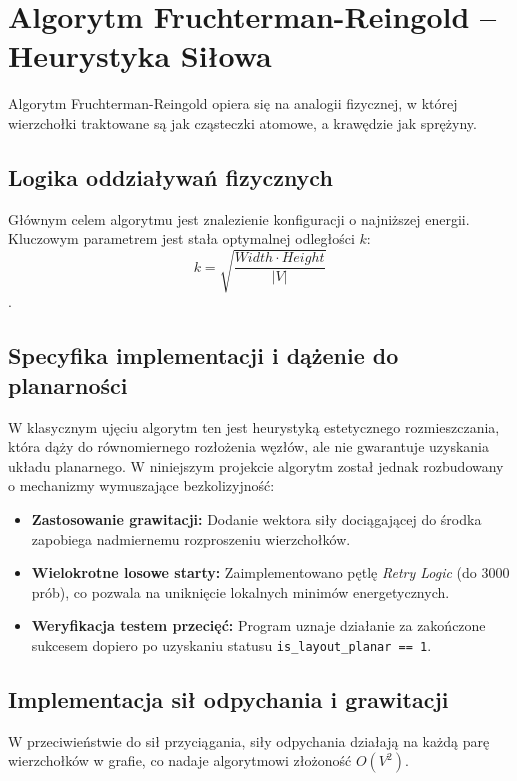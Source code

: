 \documentclass[12pt,a4paper]{article}
\begin{document}
\section{Algorytm Fruchterman-Reingold – Heurystyka Siłowa}

Algorytm Fruchterman-Reingold opiera się na analogii fizycznej, w której wierzchołki traktowane są jak cząsteczki atomowe, a krawędzie jak sprężyny.

\subsection{Logika oddziaływań fizycznych}
Głównym celem algorytmu jest znalezienie konfiguracji o najniższej energii. Kluczowym parametrem jest stała optymalnej odległości $k$:
\[ k = \sqrt{\frac{Width \cdot Height}{|V|}} \]
.

\subsection{Specyfika implementacji i dążenie do planarności}
W klasycznym ujęciu algorytm ten jest heurystyką estetycznego rozmieszczania, która dąży do równomiernego rozłożenia węzłów, ale nie gwarantuje uzyskania układu planarnego. W niniejszym projekcie algorytm został jednak rozbudowany o mechanizmy wymuszające bezkolizyjność:

\begin{itemize}
    \item \textbf{Zastosowanie grawitacji:} Dodanie wektora siły dociągającej do środka zapobiega nadmiernemu rozproszeniu wierzchołków.
    \item \textbf{Wielokrotne losowe starty:} Zaimplementowano pętlę \textit{Retry Logic} (do 3000 prób), co pozwala na uniknięcie lokalnych minimów energetycznych.
    \item \textbf{Weryfikacja testem przecięć:} Program uznaje działanie za zakończone sukcesem dopiero po uzyskaniu statusu \texttt{is\_layout\_planar == 1}.
\end{itemize}

\subsection{Implementacja sił odpychania i grawitacji}
W przeciwieństwie do sił przyciągania, siły odpychania działają na każdą parę wierzchołków w grafie, co nadaje algorytmowi złożoność $O(V^2)$.
\end{document}
